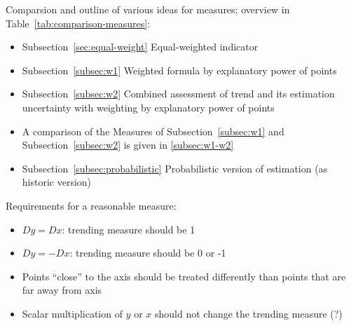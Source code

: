 \documentclass[oneside]{article}
\theoremstyle{plain}%
\theoremstyle{definition}
\newcommand{\ydiff}{D y}
\newcommand{\xdiff}{Dx}
\begin{document}
Comparsion and outline of various ideas for measures; overview in Table~\ref{tab:comparison-measures}:
\begin{itemize}
    \item Subsection~\ref{sec:equal-weight} Equal-weighted indicator
    \item Subsection~\ref{subsec:w1} Weighted formula by explanatory power of points
    \item Subsection~\ref{subsec:w2} Combined assessment of trend and its estimation uncertainty with weighting by explanatory power of points
    \item A comparison of the Measures of Subsection~\ref{subsec:w1} and Subsection~\ref{subsec:w2} is given in \ref{subsec:w1-w2}
    \item Subsection~\ref{subsec:probabilistic} Probabilistic version of estimation (as historic version)
\end{itemize}

Requirements for a reasonable measure:
\begin{itemize}
    \item $\ydiff = \xdiff$: trending measure should be 1
    \item $\ydiff = - \xdiff$: trending measure should be 0 or -1
    \item Points \enquote{close} to the axis should be treated differently than points that are far away from axis
    \item Scalar multiplication of $y$ or $x$ should not change the trending measure (?)
\end{itemize}

\end{document}
